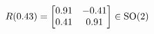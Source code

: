 \documentclass[preview]{standalone}
\begin{document}
\begin{align*}
\special{dvisvgm:raw <g id='unique000'>}R(0.43) = \begin{bmatrix} 0.91 & -0.41 \\ 0.41 & 0.91 \end{bmatrix} \in \text{SO}(2)\special{dvisvgm:raw </g>}
\end{align*}
\end{document}
